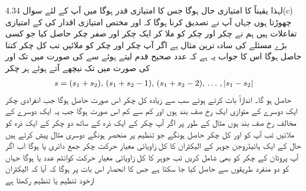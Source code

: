  لہذا  یقیناً  کا امتیازی حال ہوگا جس کا امتیازی قدر  ہوگا میں آپ کے لئے سوال 4.34(c) چھوڑتا ہوں جہاں آپ نے تصدیق کرنا ہوگا کہ  اور  مختص امتیازی اقدار کی  کے امتیازی تفاعلات ہیں ہم نے  چکر اور  چکر کو ملا کر ایک چکر اور صفر چکر حاصل کیا جو کسی بڑے مسئلے کی سادہ ترین مثال ہے اگر آپ  چکر اور  چکر کو ملائیں تب کل چکر  کتنا حاصل ہوگا اس کا جواب یہ ہے کہ عدد صحیح قدم لیتے ہوئے  سے  کی صورت میں  تک اور  کی صورت میں  تک نیچھے آتے ہوئے  ہر چکر 
\begin{align}
s=(s_1+s_2), \,(s_1+s_2-1),\, (s_1+s_2-2), \,\dotsc \, , \,\abs{s_1-s_2}
\end{align}
حاصل ہو گا۔ اندازاً بات کرتے ہوئے سب سے زیادہ کل چکر اس صورت حاصل ہوگا جب انفرادی چکر ایک دوسرے کے متوازی ایک رخ صف بند ہوں اور کم سے کم اس صورت ہوگا جب یہ ایک دوسرے کے مخالف رخ صف بند ہوں مثال کے طور پر اگر آپ  چکر کے ایک ذرہ کے ساتھ دو چکر کے ایک ذرہ کو ملائیں تب آپ کو    اور  کل چکر حاصل ہونگے جو تنظیم پر منحصر ہونگے دوسری مثال پیش کرتے ہیں حال  کے ایک ہائیڈروجن جوہر کے الیکٹران کا کل زاویائی معیار حرکت چکر جمع دائری  یا  ہوگا اب اگر آپ پروٹان کے چکر کو بھی شامل کریں تب جوہر کا کل زاویائی معیار حرکت کوانٹم عدد   یا  ہوگا جہاں  کو دو منفرد طریقوں سے حاصل کیا جا سکتا ہے جس کا انحصار اس بات پر ہوگا کہ آیا کہ الیکٹران ازخود  تنظیم یا  تنظیم رکھتا ہے

